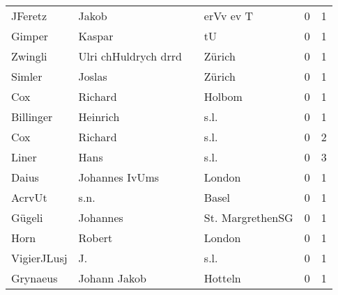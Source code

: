 \begin{center}
\begin{tiny}
\begin{longtabu}{llllrr}
                  JFeretz &                              Jakob &             &                                   erVv ev T &          0 &         1 \\
                   Gimper &                             Kaspar &             &                                          tU &          0 &         1 \\
                  Zwingli &               Ulri chHuldrych drrd &             &                                      Zürich &          0 &         1 \\
                   Simler &                             Joslas &             &                                      Zürich &          0 &         1 \\
                      Cox &                            Richard &             &                                      Holbom &          0 &         1 \\
                Billinger &                           Heinrich &             &                                        s.l. &          0 &         1 \\
                      Cox &                            Richard &             &                                        s.l. &          0 &         2 \\
                    Liner &                               Hans &             &                                        s.l. &          0 &         3 \\
                    Daius &                     Johannes IvUms &             &                                      London &          0 &         1 \\
                   AcrvUt &                               s.n. &             &                                       Basel &          0 &         1 \\
                   Gügeli &                           Johannes &             &                            St. MargrethenSG &          0 &         1 \\
                     Horn &                             Robert &             &                                      London &          0 &         1 \\
              VigierJLusj &                                 J. &             &                                        s.l. &          0 &         1 \\
                 Grynaeus &                       Johann Jakob &             &                                     Hotteln &          0 &         1 \\

\end{longtabu}
\end{tiny}
\end{center}
